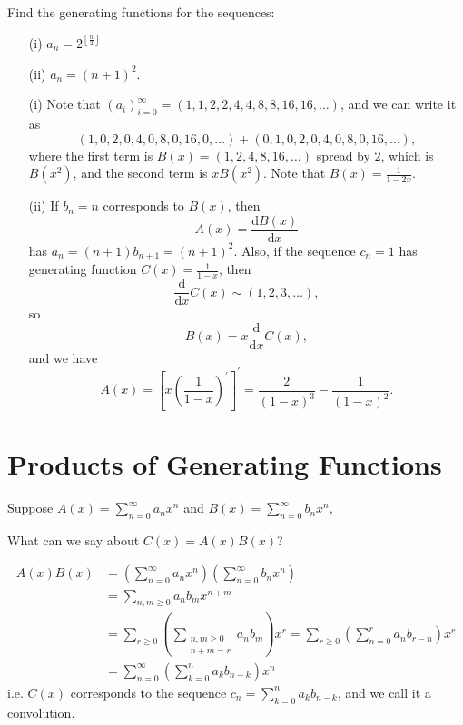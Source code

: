 \begin{eg}
    Find the generating functions for the sequences:
    \begin{itemize}
        \item [(i)] \(a_n = 2^{\left\lfloor \frac{n}{2} \right\rfloor}\)
        \item [(ii)] \(a_n = (n + 1)^2\). 
    \end{itemize}
\end{eg}
\begin{explanation}
    \vphantom{text}
    \begin{itemize}
        \item [(i)] Note that \((a_i)_{i=0}^{\infty} = (1, 1, 2, 2, 4, 4, 8, 8, 16, 16, \dots )\), and we can write it as 
        \[
            (1,0,2,0,4,0,8,0,16,0,\dots ) + (0, 1, 0, 2, 0, 4,0, 8, 0, 16,\dots ),
        \] where the first term is \(B(x) = (1, 2, 4, 8, 16, \dots )\) spread by \(2\), which is \(B \left( x^2 \right) \), and the second term is \(x B \left( x^2 \right) \). Note that \(B(x) = \frac{1}{1 - 2x}\).  
        \item [(ii)] If \(b_n = n\) corresponds to \(B(x)\), then 
        \[
            A(x) = \frac{\mathrm{d}B(x)}{\mathrm{d}x} 
        \] has \(a_n = (n + 1) b_{n+1} = (n+1)^2\). Also, if the sequence \(c_n = 1\) has generating function \(C(x) = \frac{1}{1-x}\), then 
        \[
            \frac{\mathrm{d}}{\mathrm{d}x} C(x) \sim (1,2,3, \dots ),
        \] so 
        \[
           B(x) = x \frac{\mathrm{d}}{\mathrm{d}x} C(x),
        \]
        and we have 
        \[
            A(x) = \left[ x \left( \frac{1}{1 - x} \right)^{\prime}   \right]^{\prime} = \frac{2}{(1-x)^3} - \frac{1}{(1-x)^2}. 
        \]  
    \end{itemize}
\end{explanation}

\section{Products of Generating Functions}
Suppose \(A(x) = \sum_{n=0}^{\infty} a_n x^n \) and \(B(x) = \sum_{n=0}^{\infty}  b_n x^n \),
\begin{question}
    What can we say about \(C(x) = A(x) B(x)\)?  
\end{question}
\begin{align*}
    A(x) B(x) &= \left( \sum_{n=0}^{\infty} a_n x^n  \right) \left( \sum_{n=0}^{\infty} b_n x^n  \right) \\
    &= \sum_{n, m \ge 0} a_n b_m x^{n + m} \\
    &= \sum_{r \ge 0} \left( \sum_{\substack{n, m \ge 0 \\ n + m = r}} a_n b_m  \right) x^r = \sum_{r \ge 0} \left( \sum_{n=0}^r a_n b_{r - n}  \right) x^r \\
    &= \sum_{n=0}^{\infty} \left( \sum_{k=0}^n a_k b_{n - k}  \right) x^n        
\end{align*} 
i.e. \(C(x)\) corresponds to the sequence \(c_n = \sum_{k=0}^n a_k b_{n - k} \), and we call it a convolution. 

